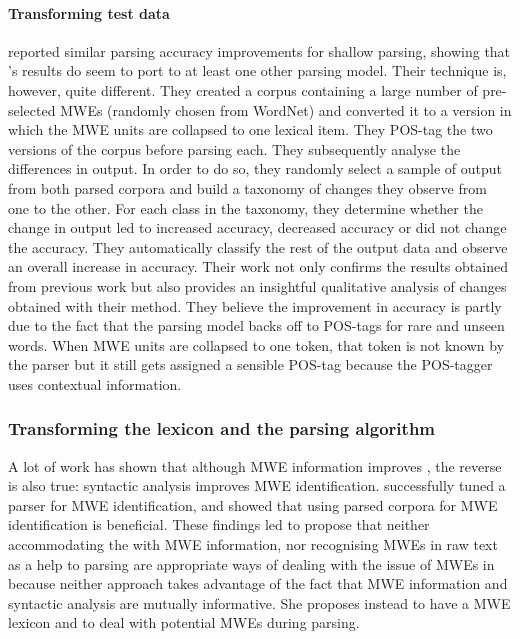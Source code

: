\documentclass[output=paper]{langsci/langscibook}
\begin{document}
                        \paragraph{Transforming test data}
                        \label{del:korkontz}
                        \indent \citet{korkontzelosetal2010} reported similar parsing accuracy improvements for shallow parsing, showing that \citet{nivre2004multiword}'s results do seem to port to at least one other parsing model. Their technique is, however, quite different. They created a corpus containing a large number of pre-selected MWEs (randomly chosen from WordNet) and converted it to a version in which the MWE units are collapsed to one lexical item. They POS-tag the two versions of the corpus before parsing each. They subsequently analyse the differences in output. In order to do so, they randomly select a sample of output from both parsed corpora and build a taxonomy of changes they observe from one to the other. For each class in the taxonomy, they determine whether the change in output led to increased accuracy, decreased accuracy or did not change the accuracy. They automatically classify the rest of the output data and observe an overall increase in accuracy. Their work not only confirms the results obtained from previous work but also provides an insightful qualitative analysis of changes obtained with their method. They believe the improvement in accuracy is partly due to the fact that the parsing model backs off to POS-tags for rare and unseen words. When MWE units are collapsed to one token, that token is not known by the parser but it still gets assigned a sensible POS-tag because the POS-tagger uses contextual information. 
                        \subsubsection{Transforming the lexicon and the parsing algorithm}
                        \indent A lot of work has shown that although MWE information improves , the reverse is also true: syntactic analysis improves MWE identification. \citet{green13} successfully tuned a parser for MWE identification, \citet{weller&heid2010} and \citet{martens&vandeghinste2010} showed that using parsed corpora for MWE identification is beneficial. These findings led \citet{seretan2013} to propose that neither accommodating the  with MWE information, nor recognising MWEs in raw text as a help to parsing are appropriate ways of dealing with the issue of MWEs in  because neither approach takes advantage of the fact that MWE information and syntactic analysis are mutually informative. She proposes instead to have a MWE lexicon and to deal with potential MWEs during parsing.
\end{document}
